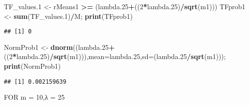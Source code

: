 \documentclass[
]{article}
\newenvironment{Shaded}{\begin{snugshade}}{\end{snugshade}}
\newcommand{\DataTypeTok}[1]{\textcolor[rgb]{0.13,0.29,0.53}{#1}}
\newcommand{\DecValTok}[1]{\textcolor[rgb]{0.00,0.00,0.81}{#1}}
\newcommand{\FloatTok}[1]{\textcolor[rgb]{0.00,0.00,0.81}{#1}}
\newcommand{\KeywordTok}[1]{\textcolor[rgb]{0.13,0.29,0.53}{\textbf{#1}}}
\newcommand{\NormalTok}[1]{#1}
\newcommand{\OperatorTok}[1]{\textcolor[rgb]{0.81,0.36,0.00}{\textbf{#1}}}
\newcommand{\StringTok}[1]{\textcolor[rgb]{0.31,0.60,0.02}{#1}}
\begin{document}
\begin{Shaded}
\begin{Highlighting}[]
\NormalTok{TF_values}\FloatTok{.1}\NormalTok{ <-}\StringTok{ }\NormalTok{rMeans1 }\OperatorTok{>=}\StringTok{ }\NormalTok{(lambda}\FloatTok{.25}\OperatorTok{+}\NormalTok{((}\DecValTok{2}\OperatorTok{*}\NormalTok{lambda}\FloatTok{.25}\NormalTok{)}\OperatorTok{/}\KeywordTok{sqrt}\NormalTok{(m1)))}
\NormalTok{TFprob1 <-}\StringTok{ }\KeywordTok{sum}\NormalTok{(TF_values}\FloatTok{.1}\NormalTok{)}\OperatorTok{/}\NormalTok{M; }\KeywordTok{print}\NormalTok{(TFprob1)}
\end{Highlighting}
\end{Shaded}

\begin{verbatim}
## [1] 0
\end{verbatim}

\begin{Shaded}
\begin{Highlighting}[]
\NormalTok{NormProb1 <-}\StringTok{ }\KeywordTok{dnorm}\NormalTok{((lambda}\FloatTok{.25}\OperatorTok{+}\NormalTok{((}\DecValTok{2}\OperatorTok{*}\NormalTok{lambda}\FloatTok{.25}\NormalTok{)}\OperatorTok{/}\KeywordTok{sqrt}\NormalTok{(m1))),}\DataTypeTok{mean=}\NormalTok{lambda}\FloatTok{.25}\NormalTok{,}\DataTypeTok{sd=}\NormalTok{(lambda}\FloatTok{.25}\OperatorTok{/}\KeywordTok{sqrt}\NormalTok{(m1))); }\KeywordTok{print}\NormalTok{(NormProb1)}
\end{Highlighting}
\end{Shaded}

\begin{verbatim}
## [1] 0.002159639
\end{verbatim}

FOR m = 10,λ = 25
\end{document}
